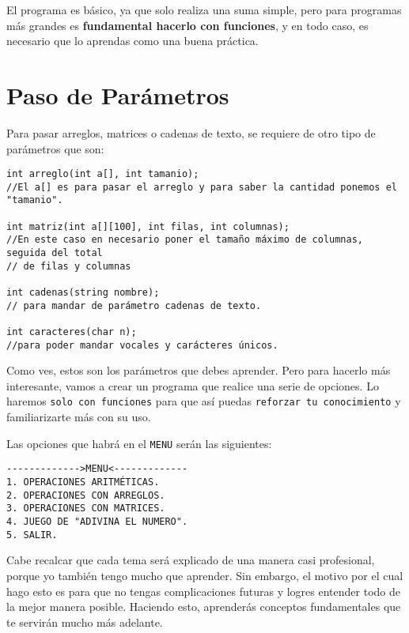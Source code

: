 \documentclass[
  11pt,
  a4paper,
  DIV=11,
  numbers=noendperiod]{scrreprt}
\begin{document}
El programa es básico, ya que solo realiza una suma simple, pero para
programas más grandes es \textbf{fundamental hacerlo con funciones}, y
en todo caso, es necesario que lo aprendas como una buena práctica.

\section{Paso de Parámetros}\label{paso-de-paruxe1metros}

Para pasar arreglos, matrices o cadenas de texto, se requiere de otro
tipo de parámetros que son:

\begin{tcolorbox}[custombox]
\begin{verbatim}
int arreglo(int a[], int tamanio);
//El a[] es para pasar el arreglo y para saber la cantidad ponemos el "tamanio".

int matriz(int a[][100], int filas, int columnas);
//En este caso en necesario poner el tamaño máximo de columnas, seguida del total
// de filas y columnas

int cadenas(string nombre);
// para mandar de parámetro cadenas de texto.

int caracteres(char n);
//para poder mandar vocales y carácteres únicos.
\end{verbatim}
\end{tcolorbox}

Como ves, estos son los parámetros que debes aprender. Pero para hacerlo
más interesante, vamos a crear un programa que realice una serie de
opciones. Lo haremos \texttt{solo\ con\ funciones} para que así puedas
\texttt{reforzar\ tu\ conocimiento} y familiarizarte más con su uso.

Las opciones que habrá en el \texttt{MENU} serán las siguientes:

\begin{tcolorbox}
\begin{verbatim}
------------->MENU<-------------
1. OPERACIONES ARITMÉTICAS.
2. OPERACIONES CON ARREGLOS.
3. OPERACIONES CON MATRICES.
4. JUEGO DE "ADIVINA EL NUMERO".
5. SALIR.
\end{verbatim}
\end{tcolorbox}

Cabe recalcar que cada tema será explicado de una manera casi
profesional, porque yo también tengo mucho que aprender. Sin embargo, el
motivo por el cual hago esto es para que no tengas complicaciones
futuras y logres entender todo de la mejor manera posible. Haciendo
esto, aprenderás conceptos fundamentales que te servirán mucho más
adelante.
\end{document}
